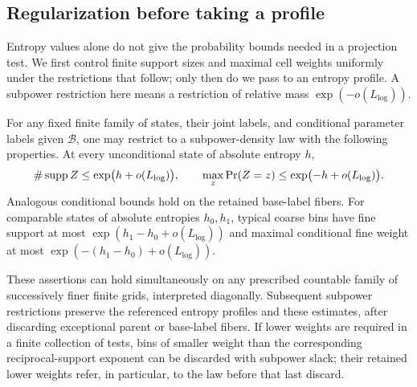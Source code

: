 \subsection{Regularization before taking a profile}

Entropy values alone do not give the probability bounds needed in a
projection test.  We first control finite support sizes and maximal
cell weights uniformly under the restrictions that follow; only then
do we pass to an entropy profile.  A subpower restriction here means
a restriction of relative mass $\exp(-o(L_{\log}))$.

\begin{lemma}\label{ent:regularization}
For any fixed finite family of states, their joint labels, and
conditional parameter labels given $\mathcal B$, one may restrict to
a subpower-density law with the following properties.  At every
unconditional state of absolute entropy $h$,
\begin{equation}\label{ent:absolute-flatness}
\#\operatorname{supp} Z\leq\exp\bigl(h+o(L_{\log})\bigr),\qquad
\max_z\Pr(Z=z)\leq\exp\bigl(-h+o(L_{\log})\bigr).
\end{equation}
Analogous conditional bounds hold on the retained base-label fibers.
For comparable states of absolute entropies $h_0,h_1$, typical coarse
bins have fine support at most
$\exp(h_1-h_0+o(L_{\log}))$ and maximal conditional fine weight at
most $\exp(-(h_1-h_0)+o(L_{\log}))$.

These assertions can hold simultaneously on any prescribed
countable family of successively finer finite grids, interpreted
diagonally.  Subsequent subpower restrictions preserve the referenced
entropy profiles and these estimates, after discarding exceptional
parent or base-label fibers.  If lower weights are required in a
finite collection of tests, bins of smaller weight than the
corresponding reciprocal-support exponent can be discarded with
subpower slack; their retained lower weights refer, in particular, to
the law before that last discard.
\end{lemma}

